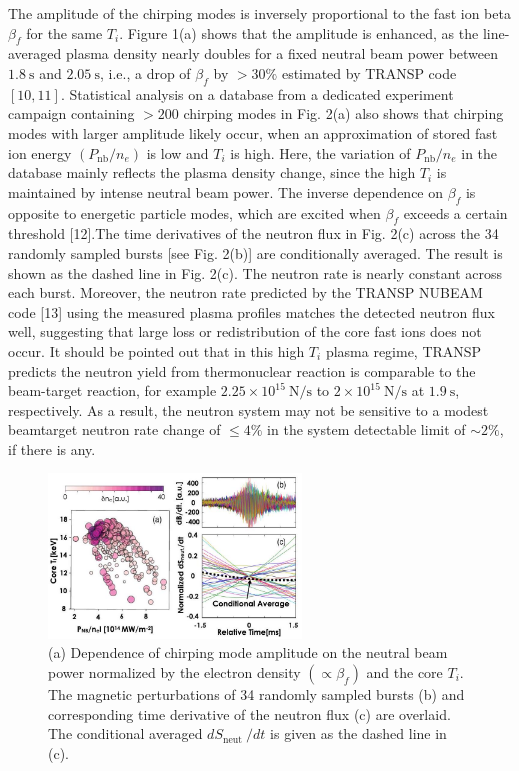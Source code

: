 \documentclass[oneside,onecolumn]{article}
\begin{document}
\begin{sloppypar}
 
 The amplitude of the chirping modes is inversely proportional to the fast ion beta $\beta_{f}$ for the same $T_{i}$. Figure 1(a) shows that the amplitude is enhanced, as the line-averaged plasma density nearly doubles for a fixed neutral beam power between $1.8 \mathrm{~s}$ and $2.05 \mathrm{~s}$, i.e., a drop of $\beta_{f}$ by $>30 \%$ estimated by TRANSP code $[10,11]$. Statistical analysis on a database from a dedicated experiment campaign containing $>200$ chirping modes in Fig. 2(a) also shows that chirping modes with larger amplitude likely occur, when an approximation of stored fast ion energy $\left(P_{\mathrm{nb}} / n_{e}\right)$ is low and $T_{i}$ is high. Here, the variation of $P_{\mathrm{nb}} / n_{e}$ in the database mainly reflects the plasma density change, since the high $T_{i}$ is maintained by intense neutral beam power. The inverse dependence on $\beta_{f}$ is opposite to energetic particle modes, which are excited when $\beta_{f}$ exceeds a certain threshold [12].The time derivatives of the neutron flux in Fig. 2(c) across the 34 randomly sampled bursts [see Fig. 2(b)] are conditionally averaged. The result is shown as the dashed line in Fig. 2(c). The neutron rate is nearly constant across each burst. Moreover, the neutron rate predicted by the TRANSP NUBEAM code [13] using the measured plasma profiles matches the detected neutron flux well, suggesting that large loss or redistribution of the core fast ions does not occur. It should be pointed out that in this high $T_{i}$ plasma regime, TRANSP predicts the neutron yield from thermonuclear reaction is comparable to the beam-target reaction, for example $2.25 \times 10^{15} \mathrm{~N} / \mathrm{s}$ to $2 \times 10^{15} \mathrm{~N} / \mathrm{s}$ at $1.9 \mathrm{~s}$, respectively. As a result, the neutron system may not be sensitive to a modest beamtarget neutron rate change of $\leq 4 \%$ in the system detectable limit of $\sim 2 \%$, if there is any.
 \begin{figure}[htbp]
 	\centering
 	\includegraphics[max width=0.6\textwidth,max height=1.0\textheight]{2023_06_19_f8dbb752866ca158c73eg-2}
 	\caption{(a) Dependence of chirping mode amplitude on the neutral beam power normalized by the electron density $\left(\propto \beta_{f}\right)$ and the core $T_{i}$. The magnetic perturbations of 34 randomly sampled bursts (b) and corresponding time derivative of the neutron flux (c) are overlaid. The conditional averaged $d S_{\text {neut }} / d t$ is given as the dashed line in (c).}
 	\label{figure2}
 \end{figure}
 

\end{sloppypar}
\end{document}

